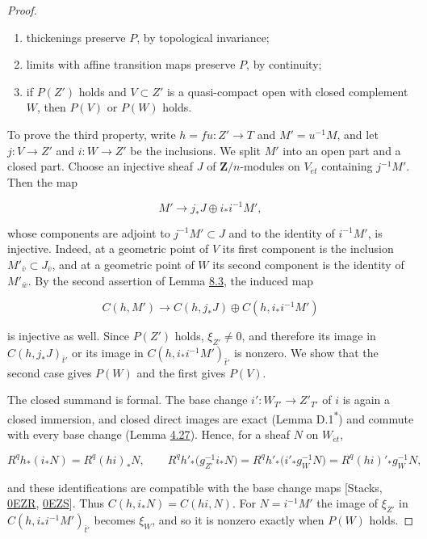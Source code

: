 \documentclass[11pt]{article}
\newcommand{\bpout}[1]{#1\textsuperscript{\hyperlink{bp-outside}{\ensuremath{\ast}}}}
\begin{document}
\begin{proof}[{Proof}]
\begin{enumerate}
\item thickenings preserve \(P\), by topological invariance;
\item limits with affine transition maps preserve \(P\), by continuity;
\item if \(P(Z')\) holds and \(V\subset Z'\) is a quasi-compact open with closed complement \(W\), then \(P(V)\) or \(P(W)\) holds.
\end{enumerate}

To prove the third property, write \(h=fu:Z'\to T\) and \(M'=u^{-1}M\), and let \(j:V\to Z'\) and \(i:W\to Z'\) be the inclusions. We split \(M'\) into an open part and a closed part. Choose an injective sheaf \(J\) of \(\mathbf Z/n\)-modules on \(V_{\acute{e}t}\) containing \(j^{-1}M'\). Then the map

\[
M'\longrightarrow j_*J\oplus i_*i^{-1}M',
\]

whose components are adjoint to \(j^{-1}M'\subset J\) and to the identity of \(i^{-1}M'\), is injective. Indeed, at a geometric point of \(V\) its first component is the inclusion \(M'_{\bar v}\subset J_{\bar v}\), and at a geometric point of \(W\) its second component is the identity of \(M'_{\bar w}\). By the second assertion of Lemma \hyperref[bp653]{8.3}, the induced map

\[
C(h,M')\longrightarrow C(h,j_*J)\oplus C(h,i_*i^{-1}M')
\]

is injective as well. Since \(P(Z')\) holds, \(\xi_{Z'}\neq0\), and therefore its image in \(C(h,j_*J)_{\bar t'}\) or its image in \(C(h,i_*i^{-1}M')_{\bar t'}\) is nonzero. We show that the second case gives \(P(W)\) and the first gives \(P(V)\).

The closed summand is formal. The base change \(i':W_{T'}\to Z'_{T'}\) of \(i\) is again a closed immersion, and closed direct images are exact (Lemma \bpout{D.1}) and commute with every base change (Lemma \hyperref[bp364]{4.27}). Hence, for a sheaf \(N\) on \(W_{\acute{e}t}\),

\[
R^qh_*(i_*N)=R^q(hi)_*N,
\qquad
R^qh'_*\bigl(g_{Z'}^{-1}i_*N\bigr)=R^qh'_*\bigl(i'_*g_W^{-1}N\bigr)
=R^q(hi)'_*g_W^{-1}N,
\]

and these identifications are compatible with the base change maps [Stacks, \href{https://stacks.math.columbia.edu/tag/0EZR}{0EZR}, \href{https://stacks.math.columbia.edu/tag/0EZS}{0EZS}]. Thus \(C(h,i_*N)=C(hi,N)\). For \(N=i^{-1}M'\) the image of \(\xi_{Z'}\) in \(C(h,i_*i^{-1}M')_{\bar t'}\) becomes \(\xi_W\), and so it is nonzero exactly when \(P(W)\) holds.


\end{proof}
\end{document}

